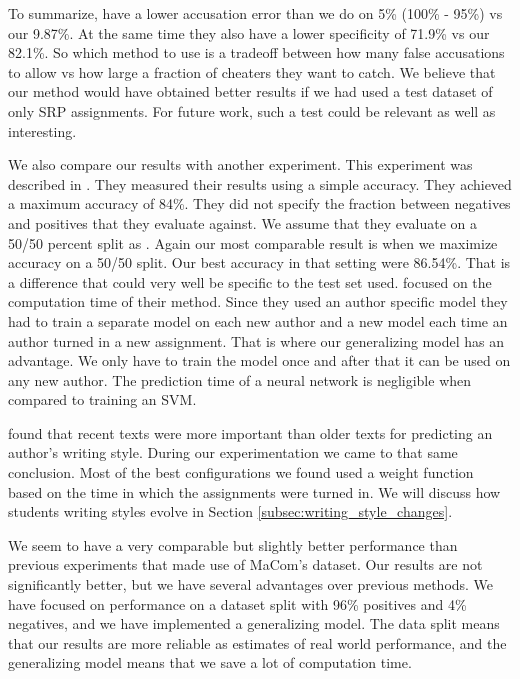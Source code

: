 To summarize, \citet{aalykke2016} have a lower accusation error than we do
on 5\% (100\% - 95\%) vs our 9.87\%. At the same time they also have a lower
specificity of 71.9\% vs our 82.1\%. So which method to use is a tradeoff
between how many false accusations to allow vs how large a fraction of cheaters
they want to catch. We believe that our method would have obtained better results if
we had used a test dataset of only \gls{SRP} assignments. For future work,
such a test could be relevant as well as interesting.

We also compare our results with another experiment. This experiment was
described in \citep{hansen2014}. They measured their results using a simple
accuracy. They achieved a maximum accuracy of 84\%. They did not specify the
fraction between negatives and positives that they evaluate against. We assume
that they evaluate on a 50/50 percent split as \citet{aalykke2016}. Again our
most comparable result is when we maximize accuracy on a 50/50 split. Our best
accuracy in that setting were 86.54\%. That is a difference that could very well
be specific to the test set used. \citet{hansen2014} focused on the computation
time of their method. Since they used an author specific model they had to train
a separate model on each new author and a new model each time an author turned
in a new assignment. That is where our generalizing model has an advantage.
We only have to train the model once and after that it can be used on any new
author. The prediction time of a neural network is negligible when compared to
training an \gls{SVM}.

\citet{hansen2014} found that recent texts were more important than older
texts for predicting an author's writing style. During our experimentation
we came to that same conclusion. Most of the best configurations we found
used a weight function based on the time in which the assignments were
turned in. We will discuss how students writing styles evolve in Section
\ref{subsec:writing_style_changes}.

We seem to have a very comparable but slightly better performance than previous
experiments that made use of MaCom's dataset. Our results are not significantly
better, but we have several advantages over previous methods. We have focused
on performance on a dataset split with 96\% positives and 4\% negatives, and we
have implemented a generalizing model. The data split means that our results are
more reliable as estimates of real world performance, and the generalizing model
means that we save a lot of computation time.


